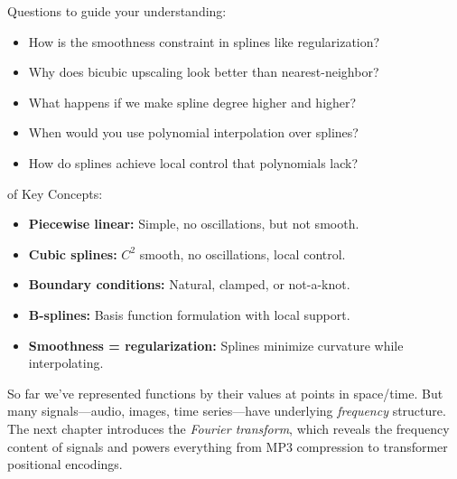  Questions to guide your understanding:
\begin{itemize}
    \item How is the smoothness constraint in splines like regularization?
    \item Why does bicubic upscaling look better than nearest-neighbor?
    \item What happens if we make spline degree higher and higher?
    \item When would you use polynomial interpolation over splines?
    \item How do splines achieve local control that polynomials lack?
\end{itemize}

 of Key Concepts:
\begin{itemize}
    \item \textbf{Piecewise linear:} Simple, no oscillations, but not smooth.
    \item \textbf{Cubic splines:} $C^2$ smooth, no oscillations, local control.
    \item \textbf{Boundary conditions:} Natural, clamped, or not-a-knot.
    \item \textbf{B-splines:} Basis function formulation with local support.
    \item \textbf{Smoothness = regularization:} Splines minimize curvature while interpolating.
\end{itemize}



 So far we've represented functions by their values at points in space/time. But many signals---audio, images, time series---have underlying \emph{frequency} structure. The next chapter introduces the \emph{Fourier transform}, which reveals the frequency content of signals and powers everything from MP3 compression to transformer positional encodings.



